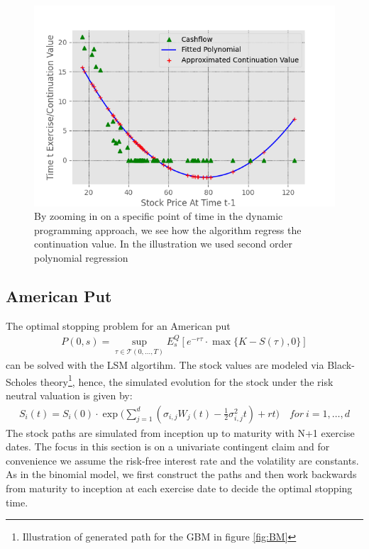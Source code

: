 \begin{figure}[th]
\centering
\includegraphics{Figures/LSMFit1.png}
\decoRule
\caption[Polynomial Regression of Continuation Value]{By zooming in on a specific point of time in the dynamic programming approach, we see how the algorithm regress the continuation value. In the illustration we used second order polynomial regression}
\label{fig:LSM1}
\end{figure}

\subsection{American Put}
The optimal stopping problem for an American put 
\begin{equation}\label{optimalStopPut}
\begin{split}
P(0,s) = \sup_{\tau \in \mathcal{T}(0,\ldots,T)} E_{s}^Q[ e^{-r \tau} \cdot \max\{K-S(\tau), 0 \}]
\end{split}
\end{equation}
can be solved with the LSM algortihm. The stock values are modeled via Black-Scholes theory\footnote{Illustration of generated path for the GBM in figure \ref{fig:BM}}, hence, the simulated evolution for the stock under the risk neutral valuation is given by:
\begin{equation*}
\begin{split}
S_i(t)=S_i(0) \cdot \exp \bigg( \sum_{j=1}^{d}(\sigma_{i,j} W_j(t) -\frac{1}{2} \sigma_{i,j}^2 t) + rt \bigg) \quad  for \ i=1,\ldots,d
\end{split}
\end{equation*}
The stock paths are simulated from inception up to maturity with N+1 exercise dates. The focus in this section is on a univariate contingent claim and for convenience we assume the risk-free interest rate and the volatility are constants. As in the binomial model, we first construct the paths and then work backwards from maturity to inception at each exercise date to decide the optimal stopping time. \\

